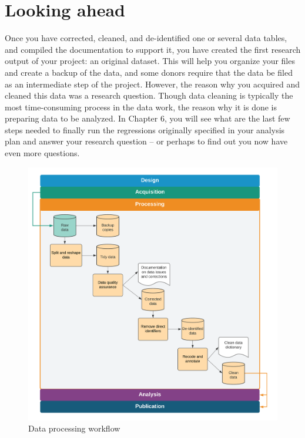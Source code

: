 \section{Looking ahead}
Once you have corrected, cleaned, 
and de-identified one or several data tables,
and compiled the documentation to support it,
you have created the first research output of your project: an original dataset.
This will help you organize your files and create a backup of the data,
and some donors require that the data be filed as an intermediate step of the project.
However, the reason why you acquired and cleaned this data
was a research question.
Though data cleaning is typically the most time-consuming process in the data work,
the reason why it is done is preparing data to be analyzed.
In Chapter 6, you will see what are the last few steps needed to finally run the
regressions originally specified in your analysis plan
and answer your research question --
or perhaps to find out you now have even more questions.

\begin{fullwidth}
	\begin{figure}
		\centering
		\includegraphics[width=1.6\linewidth]{diagrams/Cleaning}
		\caption{Data processing workflow}
		\label{fig:cleaning}
	\end{figure}
\end{fullwidth}

